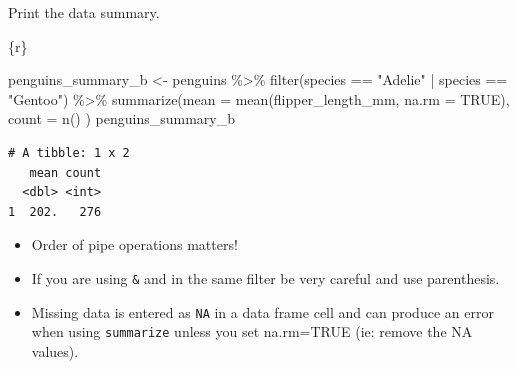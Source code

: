 \documentclass[
  letterpaper,
  DIV=11,
  numbers=noendperiod]{scrreprt}
\newenvironment{Shaded}{\begin{snugshade}}{\end{snugshade}}
\newcommand{\AttributeTok}[1]{\textcolor[rgb]{0.40,0.45,0.13}{#1}}
\newcommand{\ConstantTok}[1]{\textcolor[rgb]{0.56,0.35,0.01}{#1}}
\newcommand{\FunctionTok}[1]{\textcolor[rgb]{0.28,0.35,0.67}{#1}}
\newcommand{\InformationTok}[1]{\textcolor[rgb]{0.37,0.37,0.37}{#1}}
\newcommand{\NormalTok}[1]{\textcolor[rgb]{0.00,0.23,0.31}{#1}}
\newcommand{\OtherTok}[1]{\textcolor[rgb]{0.00,0.23,0.31}{#1}}
\newcommand{\SpecialCharTok}[1]{\textcolor[rgb]{0.37,0.37,0.37}{#1}}
\newcommand{\StringTok}[1]{\textcolor[rgb]{0.13,0.47,0.30}{#1}}
\providecommand{\tightlist}{%
  \setlength{\itemsep}{0pt}\setlength{\parskip}{0pt}}\usepackage{longtable,booktabs,array}
\begin{document}
\begin{tcolorbox}[enhanced jigsaw, colframe=quarto-callout-note-color-frame, breakable, colback=white, toprule=.15mm, leftrule=.75mm, left=2mm, opacityback=0, rightrule=.15mm, arc=.35mm, bottomrule=.15mm]

Print the data summary.

\begin{Shaded}
\begin{Highlighting}[]
\InformationTok{\textasciigrave{}\textasciigrave{}\textasciigrave{}\{r\}}

\NormalTok{penguins\_summary\_b }\OtherTok{\textless{}{-}}\NormalTok{ penguins }\SpecialCharTok{\%\textgreater{}\%} 
  \FunctionTok{filter}\NormalTok{(species }\SpecialCharTok{==} \StringTok{"Adelie"} \SpecialCharTok{|}\NormalTok{ species }\SpecialCharTok{==} \StringTok{"Gentoo"}\NormalTok{) }\SpecialCharTok{\%\textgreater{}\%} 
  \FunctionTok{summarize}\NormalTok{(}\AttributeTok{mean =} \FunctionTok{mean}\NormalTok{(flipper\_length\_mm, }\AttributeTok{na.rm =} \ConstantTok{TRUE}\NormalTok{),}
            \AttributeTok{count =} \FunctionTok{n}\NormalTok{() )}
\NormalTok{penguins\_summary\_b}
\InformationTok{\textasciigrave{}\textasciigrave{}\textasciigrave{}}
\end{Highlighting}
\end{Shaded}

\begin{verbatim}
# A tibble: 1 x 2
   mean count
  <dbl> <int>
1  202.   276
\end{verbatim}

\end{tcolorbox}

\begin{tcolorbox}[enhanced jigsaw, colframe=quarto-callout-note-color-frame, breakable, colback=white, toprule=.15mm, leftrule=.75mm, left=2mm, opacityback=0, rightrule=.15mm, arc=.35mm, bottomrule=.15mm]

\begin{itemize}
\tightlist
\item
  Order of pipe operations matters!
\item
  If you are using \texttt{\&} and \texttt{\textbar{}} in the same
  filter be very careful and use parenthesis.
\item
  Missing data is entered as \texttt{NA} in a data frame cell and can
  produce an error when using \texttt{summarize} unless you set
  na.rm=TRUE (ie: remove the NA values).
\end{itemize}

\end{tcolorbox}
\end{document}
